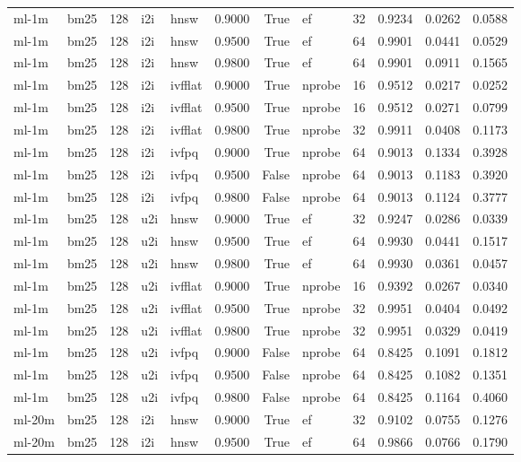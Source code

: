 \begin{tabular}{llrllrrlrrrr}
ml-1m & bm25 & 128 & i2i & hnsw & 0.9000 & True & ef & 32 & 0.9234 & 0.0262 & 0.0588 \\
ml-1m & bm25 & 128 & i2i & hnsw & 0.9500 & True & ef & 64 & 0.9901 & 0.0441 & 0.0529 \\
ml-1m & bm25 & 128 & i2i & hnsw & 0.9800 & True & ef & 64 & 0.9901 & 0.0911 & 0.1565 \\
ml-1m & bm25 & 128 & i2i & ivfflat & 0.9000 & True & nprobe & 16 & 0.9512 & 0.0217 & 0.0252 \\
ml-1m & bm25 & 128 & i2i & ivfflat & 0.9500 & True & nprobe & 16 & 0.9512 & 0.0271 & 0.0799 \\
ml-1m & bm25 & 128 & i2i & ivfflat & 0.9800 & True & nprobe & 32 & 0.9911 & 0.0408 & 0.1173 \\
ml-1m & bm25 & 128 & i2i & ivfpq & 0.9000 & True & nprobe & 64 & 0.9013 & 0.1334 & 0.3928 \\
ml-1m & bm25 & 128 & i2i & ivfpq & 0.9500 & False & nprobe & 64 & 0.9013 & 0.1183 & 0.3920 \\
ml-1m & bm25 & 128 & i2i & ivfpq & 0.9800 & False & nprobe & 64 & 0.9013 & 0.1124 & 0.3777 \\
ml-1m & bm25 & 128 & u2i & hnsw & 0.9000 & True & ef & 32 & 0.9247 & 0.0286 & 0.0339 \\
ml-1m & bm25 & 128 & u2i & hnsw & 0.9500 & True & ef & 64 & 0.9930 & 0.0441 & 0.1517 \\
ml-1m & bm25 & 128 & u2i & hnsw & 0.9800 & True & ef & 64 & 0.9930 & 0.0361 & 0.0457 \\
ml-1m & bm25 & 128 & u2i & ivfflat & 0.9000 & True & nprobe & 16 & 0.9392 & 0.0267 & 0.0340 \\
ml-1m & bm25 & 128 & u2i & ivfflat & 0.9500 & True & nprobe & 32 & 0.9951 & 0.0404 & 0.0492 \\
ml-1m & bm25 & 128 & u2i & ivfflat & 0.9800 & True & nprobe & 32 & 0.9951 & 0.0329 & 0.0419 \\
ml-1m & bm25 & 128 & u2i & ivfpq & 0.9000 & False & nprobe & 64 & 0.8425 & 0.1091 & 0.1812 \\
ml-1m & bm25 & 128 & u2i & ivfpq & 0.9500 & False & nprobe & 64 & 0.8425 & 0.1082 & 0.1351 \\
ml-1m & bm25 & 128 & u2i & ivfpq & 0.9800 & False & nprobe & 64 & 0.8425 & 0.1164 & 0.4060 \\
ml-20m & bm25 & 128 & i2i & hnsw & 0.9000 & True & ef & 32 & 0.9102 & 0.0755 & 0.1276 \\
ml-20m & bm25 & 128 & i2i & hnsw & 0.9500 & True & ef & 64 & 0.9866 & 0.0766 & 0.1790 \\

\end{tabular}
